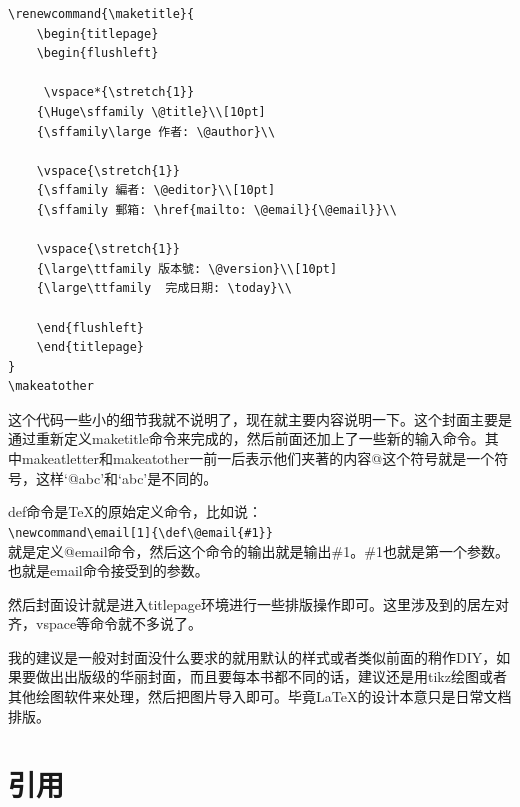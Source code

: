 \documentclass[12pt,oneside]{book}
\begin{document}
\begin{common-format}
\begin{Verbatim}
\renewcommand{\maketitle}{
	\begin{titlepage}
	\begin{flushleft}
	
	 \vspace*{\stretch{1}}
    {\Huge\sffamily \@title}\\[10pt]
    {\sffamily\large 作者: \@author}\\
    	
	\vspace{\stretch{1}}
	{\sffamily 編者: \@editor}\\[10pt]
	{\sffamily 郵箱: \href{mailto: \@email}{\@email}}\\
	
	\vspace{\stretch{1}}
	{\large\ttfamily 版本號: \@version}\\[10pt]
	{\large\ttfamily  完成日期: \today}\\
	
	\end{flushleft}
	\end{titlepage}
}
\makeatother
\end{Verbatim}
这个代码一些小的细节我就不说明了，现在就主要内容说明一下。这个封面主要是通过重新定义maketitle命令来完成的，然后前面还加上了一些新的输入命令。其中makeatletter和makeatother一前一后表示他们夹著的内容@这个符号就是一个符号，这样‘@abc’和‘abc’是不同的。

def命令是\TeX 的原始定义命令，比如说：\\
\verb+\newcommand\email[1]{\def\@email{#1}}+\\
就是定义@email命令，然后这个命令的输出就是输出\#{}1。\#{}1也就是第一个参数。也就是email命令接受到的参数。

然后封面设计就是进入titlepage环境进行一些排版操作即可。这里涉及到的居左对齐，vspace等命令就不多说了。

我的建议是一般对封面没什么要求的就用默认的样式或者类似前面的稍作DIY，如果要做出出版级的华丽封面，而且要每本书都不同的话，建议还是用tikz绘图或者其他绘图软件来处理，然后把图片导入即可。毕竟\LaTeX 的设计本意只是日常文档排版。





\section{引用}

\end{common-format}
\end{document}
